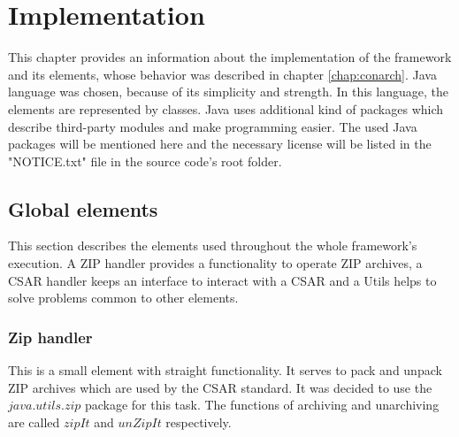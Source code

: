 
\chapter{Implementation}\label{chap:imp}
This chapter provides an information about the implementation of the framework and its elements, whose behavior was described in chapter \ref{chap:conarch}.
Java language was chosen, because of its simplicity and strength. 
In this language, the elements are represented by classes.
Java uses additional kind of packages which describe third-party modules and make programming easier. 
The used Java packages will be mentioned here and the necessary license will be listed in the "NOTICE.txt" file in the source code's root folder.

\section{Global elements}
This section describes the elements used throughout the whole framework's execution.
A ZIP handler provides a functionality to operate ZIP archives, a CSAR handler keeps an interface to interact with a CSAR and a Utils helps to solve problems common to other elements.

\subsection*{Zip handler}
This is a small element with straight functionality. 
It serves to pack and unpack ZIP archives which are used by the CSAR standard.
It was decided to use the $java$.$utils$.$zip$ package for this task.
The functions of archiving and unarchiving are called $zipIt$ and $unZipIt$ respectively. 

